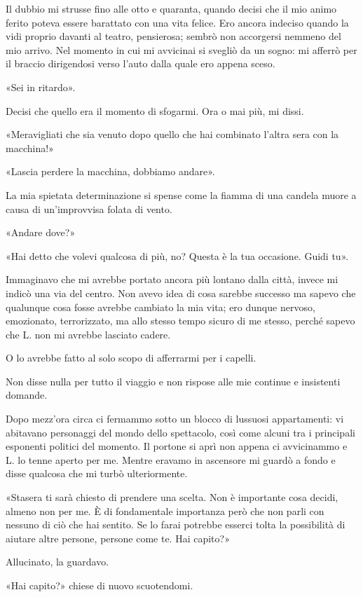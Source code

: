 \documentclass[a4paper,12pt]{book}
\begin{document}
Il dubbio mi strusse fino alle otto e quaranta, quando decisi che il mio animo
ferito poteva essere barattato con una vita felice. Ero ancora indeciso quando
la vidi proprio davanti al teatro, pensierosa; sembrò non accorgersi nemmeno
del mio arrivo. Nel momento in cui mi avvicinai si svegliò da un sogno: mi
afferrò per il braccio dirigendosi verso l'auto dalla quale ero appena
sceso.

«Sei in ritardo».

Decisi che quello era il momento di sfogarmi. Ora o mai più, mi dissi.

«Meravigliati che sia venuto dopo quello che hai combinato l'altra sera con
la macchina!»

«Lascia perdere la macchina, dobbiamo andare».

La mia spietata determinazione si spense come la fiamma di una candela muore a
causa di un'improvvisa folata di vento.

«Andare dove?»

«Hai detto che volevi qualcosa di più, no? Questa è la tua occasione. Guidi
tu».

Immaginavo che mi avrebbe portato ancora più lontano dalla città, invece mi
indicò una via del centro. Non avevo idea di cosa sarebbe successo ma sapevo
che qualunque cosa fosse avrebbe cambiato la mia vita; ero dunque nervoso,
emozionato, terrorizzato, ma allo stesso tempo sicuro di me stesso, perché
sapevo che L. non mi avrebbe lasciato cadere.

O lo avrebbe fatto al solo scopo di afferrarmi per i capelli.

Non disse nulla per tutto il viaggio e non rispose alle mie continue e
insistenti domande.

Dopo mezz'ora circa ci fermammo sotto un blocco di lussuosi appartamenti: vi
abitavano personaggi del mondo dello spettacolo, così come alcuni tra i
principali esponenti politici del momento. Il portone si aprì non appena ci
avvicinammo e L. lo tenne aperto per me. Mentre eravamo in ascensore mi guardò a
fondo e disse qualcosa che mi turbò ulteriormente.

«Stasera ti sarà chiesto di prendere una scelta. Non è importante cosa
decidi, almeno non per me. È di fondamentale importanza però che non parli
con nessuno di ciò che hai sentito. Se lo farai potrebbe esserci tolta la
possibilità di aiutare altre persone, persone come te. Hai capito?»

Allucinato, la guardavo.

«Hai capito?» chiese di nuovo scuotendomi.
\end{document}
